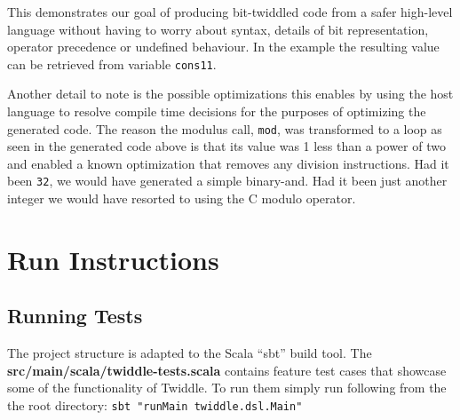 \documentclass{article}
\begin{document}
This demonstrates our goal of producing bit-twiddled code from a safer high-level language without having to worry about syntax, details of bit representation, operator precedence or undefined behaviour. In the example  the resulting value can be retrieved from variable \texttt{cons11}.

Another detail to note is the possible optimizations this enables by using the host language to resolve compile time decisions for the purposes of optimizing the generated code. The reason the modulus call, \texttt{mod}, was transformed to a loop as seen in the generated code above is that its
value was 1 less than a power of two and enabled a known optimization that removes any division instructions. Had it been \texttt{32}, we would have generated a simple binary-and. Had it been just another integer we would have resorted to using the C modulo operator.

\section{Run Instructions}
\subsection{Running Tests}
The project structure is adapted to the Scala ``sbt'' build tool. The \textbf{src/main/scala/twiddle-tests.scala} contains feature test cases that showcase some of the functionality of Twiddle. To run them simply
run following from the the root directory: \texttt{sbt "runMain twiddle.dsl.Main"}
\end{document}

